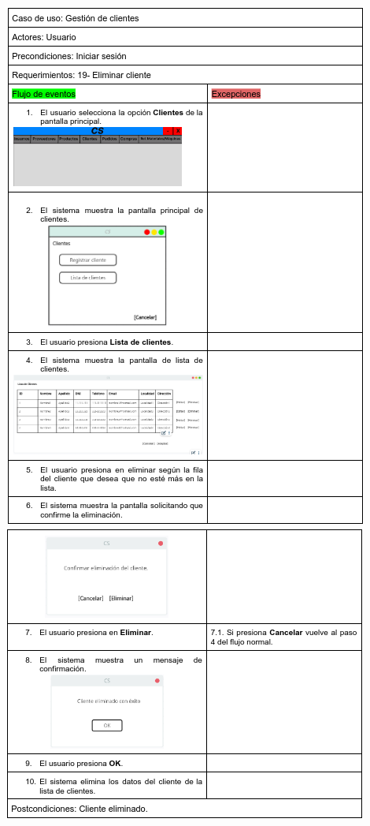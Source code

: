\documentclass{article}
\begin{document}
    \begin{center}
    		\includegraphics[width=1\linewidth]{imagenes/19_especificacion_clientes.png}
		\includegraphics[width=1\linewidth]{imagenes/19_especificacion_clientes2.png}
    \end{center}
    
\end{document}
